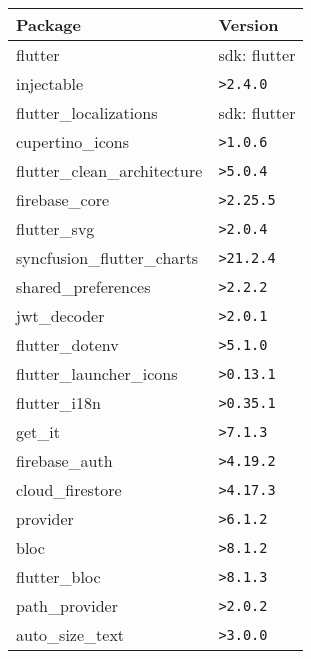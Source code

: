\begin{table}[h!]
    \centering
    \begin{tabular}{|m{}|m{}|}
        \hline
        \textbf{Package}                 & \textbf{Version} \\ \hline
        flutter                          & sdk: flutter     \\ \hline
        injectable                       & \texttt{>2.4.0}  \\ \hline
        flutter\_localizations           & sdk: flutter     \\ \hline
        cupertino\_icons                 & \texttt{>1.0.6}  \\ \hline
        flutter\_clean\_architecture     & \texttt{>5.0.4}  \\ \hline
        firebase\_core                   & \texttt{>2.25.5} \\ \hline
        flutter\_svg                     & \texttt{>2.0.4}  \\ \hline
        syncfusion\_flutter\_charts      & \texttt{>21.2.4} \\ \hline
        shared\_preferences              & \texttt{>2.2.2}  \\ \hline
        jwt\_decoder                     & \texttt{>2.0.1}  \\ \hline
        flutter\_dotenv                  & \texttt{>5.1.0}  \\ \hline
        flutter\_launcher\_icons         & \texttt{>0.13.1} \\ \hline
        flutter\_i18n                    & \texttt{>0.35.1} \\ \hline
        get\_it                          & \texttt{>7.1.3}  \\ \hline
        firebase\_auth                   & \texttt{>4.19.2} \\ \hline
        cloud\_firestore                 & \texttt{>4.17.3} \\ \hline
        provider                         & \texttt{>6.1.2}  \\ \hline
        bloc                             & \texttt{>8.1.2}  \\ \hline
        flutter\_bloc                    & \texttt{>8.1.3}  \\ \hline
        path\_provider                   & \texttt{>2.0.2}  \\ \hline
        auto\_size\_text                 & \texttt{>3.0.0}  \\ \hline

\end{tabular}
\end{table}
